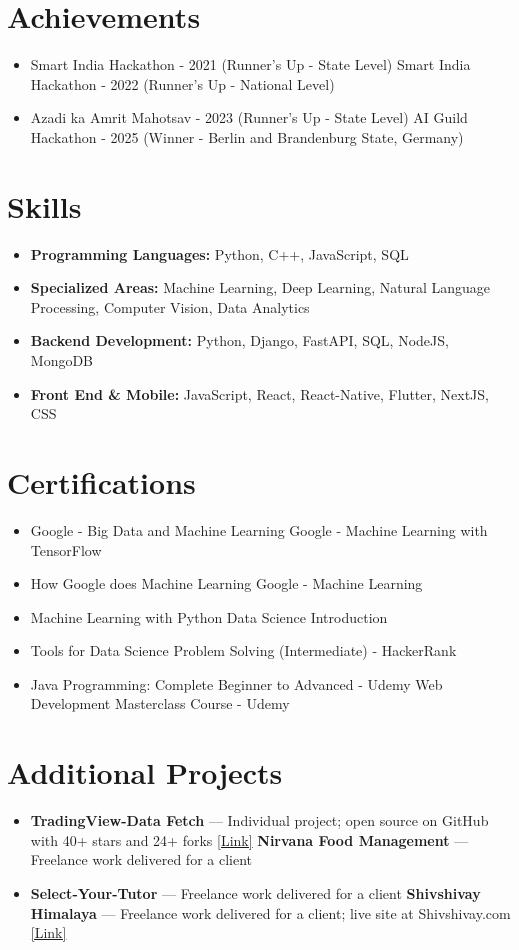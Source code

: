 \documentclass[a4paper,10pt]{article}
\begin{document}
\section*{Achievements}
\begin{itemize}
\item Smart India Hackathon - 2021 (Runner's Up - State Level) \hfill Smart India Hackathon - 2022 (Runner's Up - National Level)
\item Azadi ka Amrit Mahotsav - 2023 (Runner's Up - State Level) \hfill AI Guild Hackathon - 2025 (Winner - Berlin and Brandenburg State, Germany)
\end{itemize}

\section*{Skills}
\begin{itemize}
  \item \textbf{Programming Languages:} Python, C++, JavaScript, SQL
  \item \textbf{Specialized Areas:} Machine Learning, Deep Learning, Natural Language Processing, Computer Vision, Data Analytics
  \item \textbf{Backend Development:} Python, Django, FastAPI, SQL, NodeJS, MongoDB
  \item \textbf{Front End \& Mobile:} JavaScript, React, React-Native, Flutter, NextJS, CSS
\end{itemize}

\section*{Certifications}
\begin{itemize}
\item Google - Big Data and Machine Learning \hfill Google - Machine Learning with TensorFlow
\item How Google does Machine Learning \hfill Google - Machine Learning
\item Machine Learning with Python \hfill Data Science Introduction
\item Tools for Data Science \hfill Problem Solving (Intermediate) - HackerRank
\item Java Programming: Complete Beginner to Advanced - Udemy \hfill Web Development Masterclass Course - Udemy
\end{itemize}

\section*{Additional Projects}
\begin{itemize}
\item \textbf{TradingView-Data Fetch} — Individual project; open source on GitHub with 40+ stars and 24+ forks \href{https://github.com/ravalmeet/TradingView}{[Link]} \hfill \textbf{Nirvana Food Management} — Freelance work delivered for a client
\item \textbf{Select-Your-Tutor} — Freelance work delivered for a client \hfill \textbf{Shivshivay Himalaya} — Freelance work delivered for a client; live site at Shivshivay.com \href{Shivshivay.com}{[Link]}
\end{itemize}
\end{document}
